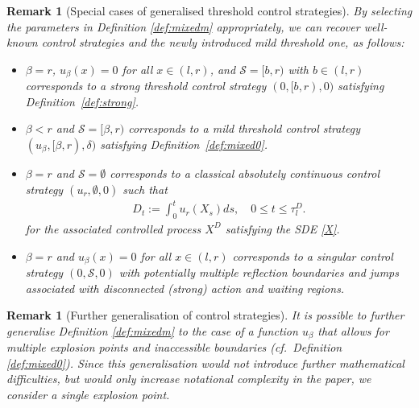 \documentclass[11pt]{article} %
\newtheorem{remark}[theorem]{Remark}
\numberwithin{komcounter}{section}
\begin{document}
\begin{remark}[Special cases of generalised threshold control strategies] \label{rem:controls}
By selecting the parameters in Definition \ref{def:mixedm} appropriately, we can recover well-known control strategies and the newly introduced mild threshold one, as follows: 
\begin{itemize}
\vspace{-2mm}
\item $\beta=r$, $u_\beta(x)=0$ for all $x\in(l,r)$, and $\mathcal{S}=[b,r)$ with $ b\in (l,r)$ corresponds to a strong threshold control strategy $(0,[b,r),0)$ satisfying Definition~\ref{def:strong}. 

\vspace{-2mm}
\item $\beta<r$ and $\mathcal{S}=[\beta,r)$ corresponds to a mild threshold control strategy $(u_\beta,[\beta,r),\delta)$ satisfying Definition~\ref{def:mixed0}.

\vspace{-2mm}
\item $\beta=r$ and $\mathcal{S}=\emptyset$ corresponds to a classical absolutely continuous control strategy $(u_r,\emptyset,0)$ such that  
\begin{align*}
D_t := \int_{0}^{t} u_r(X_s) ds ,\quad 0 \leq t \leq \tau^D_l.
\end{align*}
for the associated controlled process $X^D$ satisfying the SDE \eqref{X}. 

\vspace{-2mm}
\item $\beta=r$ and $u_\beta(x)=0$ for all $x\in(l,r)$ corresponds to a singular control strategy $(0,\mathcal{S},0)$ with potentially multiple reflection boundaries and jumps associated with disconnected (strong) action and waiting regions. 
\end{itemize}
\end{remark}




\begin{remark}[Further generalisation of control strategies] \label{rem:multi-beta}
It is possible to further generalise Definition \ref{def:mixedm} to the case of a function $u_\beta$ that allows for multiple explosion points and inaccessible boundaries (cf.~Definition \ref{def:mixed0}). 
Since this generalisation would not introduce further mathematical difficulties, but would only increase notational complexity in the paper, we consider a single explosion point. 
\end{remark}
\end{document}
